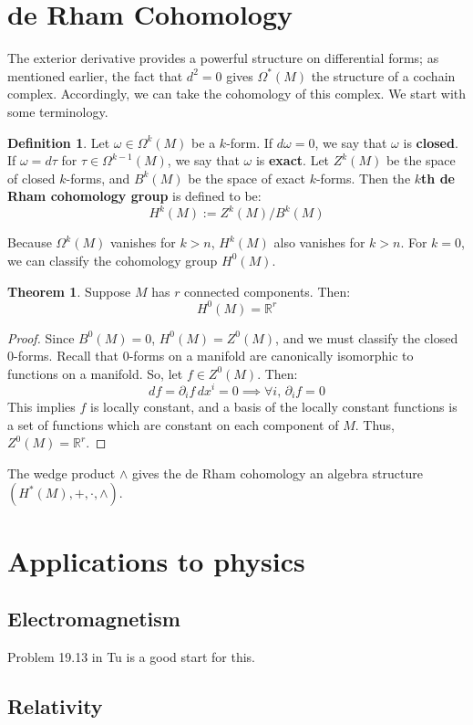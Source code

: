\documentclass[11pt, oneside]{article}   	%
\theoremstyle{definition}
\newtheorem{definition}{Definition}[section]
\newtheorem{theorem}{Theorem}[section]
\begin{document}
\section{de Rham Cohomology}

The exterior derivative provides a powerful structure on differential forms; as mentioned earlier, the fact that $d^2 = 0$ gives 
$\Omega^*(M)$ the structure of a cochain complex. Accordingly, we can take the cohomology of this complex. We start 
with some terminology.
\begin{definition}
	Let $\omega\in\Omega^k(M)$ be a $k$-form. If $d\omega = 0$, we say that $\omega$ is \textbf{closed}. If $\omega = 
	d\tau$ for $\tau\in\Omega^{k - 1}(M)$, we say that $\omega$ is \textbf{exact}. Let $Z^k(M)$ be the space of closed 
	$k$-forms, and $B^k(M)$ be the space of exact $k$-forms. Then the \textbf{$k$th de Rham cohomology group} is 
	defined to be:
	\begin{equation}
		H^k(M) := Z^k(M) / B^k(M)
	\end{equation}
\end{definition}

Because $\Omega^k(M)$ vanishes for $k > n$, $H^k(M)$ also vanishes for $k > n$. For $k = 0$, we can classify 
the cohomology group $H^0(M)$.
\begin{theorem}
	Suppose $M$ has $r$ connected components. Then:
	\begin{equation}
		H^0(M) = \mathbb R^r
	\end{equation}
\end{theorem}
\begin{proof}
	Since $B^0(M) = 0$, $H^0(M) = Z^0(M)$, and we must classify the closed $0$-forms. Recall that 0-forms on a manifold 
	are canonically isomorphic to functions on a manifold. So, let $f\in Z^0(M)$. Then:
	\begin{equation}
		df = \partial_i f\, dx^i = 0\implies \forall i,\,\partial_i f = 0
	\end{equation}
	This implies $f$ is locally constant, and a basis of the locally constant functions is a set of functions which are 
	constant on each component of $M$. Thus, $Z^0(M) = \mathbb R^r$. 
\end{proof}

The wedge product $\wedge$ gives the de Rham cohomology an algebra structure $(H^*(M), +, \cdot, \wedge)$. 

\section{Applications to physics}

\subsection{Electromagnetism}

Problem 19.13 in Tu is a good start for this. 

\subsection{Relativity}
\end{document}
